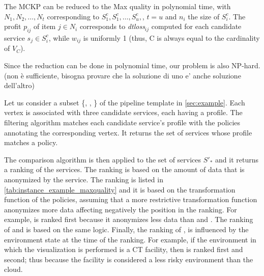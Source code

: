     The MCKP can be reduced to the Max quality \problem in polynomial time, with $N_1,N_2,\ldots,N_t$ corresponding to $S^c_{1}, S^c_{1}, \ldots, S^c_{u},$, $t$$=$$u$ and $n_i$ the size of $S^c_{i}$. The profit $p_{ij}$ of item $j$$\in$$N_i$ corresponds to \textit{dtloss}$_{ij}$ computed for each candidate service $s_j$$\in$$S^c_{i}$, while $w_{ij}$ is uniformly 1 (thus, C is always equal to the cardinality of $V_C$).

    Since the reduction can be done in polynomial time, our problem is also NP-hard. (non è sufficiente, bisogna provare che la soluzione di uno e' anche soluzione dell'altro)


    \begin{example}
      Let us consider a subset \{, , \} of the pipeline template \tChartFunction in \cref{sec:example}.
      Each vertex is associated with three candidate services, each having a profile. The filtering algorithm matches each candidate service's profile with the policies annotating the corresponding vertex. It returns the set of services whose profile matches a policy.

      The comparison algorithm is then applied to the set of services $S'_*$ and it returns a ranking of the services.
      The ranking is based on the amount of data that is anonymized by the service.
      The ranking is listed in \cref{tab:instance_example_maxquality} and it is based on the transformation function of the policies,
      assuming that a more restrictive transformation function anonymizes more data affecting negatively the position in the ranking.
      For example,  is ranked first because it anonymizes less data than  and .
      The ranking of  and  is based on the same logic.
      Finally, the ranking of ,  is influenced by the environment state at the time of the ranking.
      For example, if the environment in which the visualization is performed is a CT facility, then  is ranked first and  second;
      thus because the facility is considered a less risky environment than the cloud.

    \end{example}


